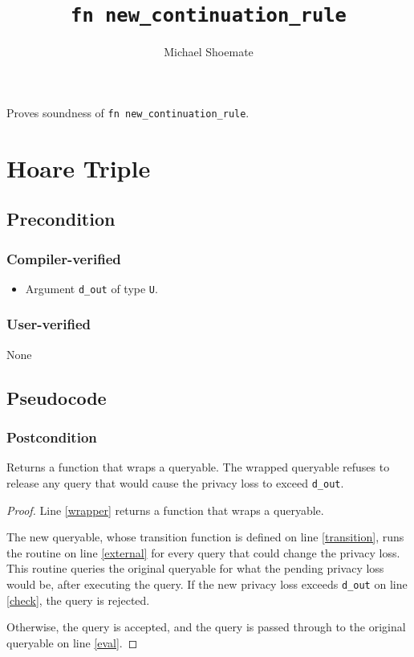 \documentclass{article}
\title{\texttt{fn new\_continuation\_rule}}
\author{Michael Shoemate}
\date{}
\begin{document}
\maketitle

\contrib
Proves soundness of \texttt{fn new\_continuation\_rule}.

\section{Hoare Triple}
\subsection*{Precondition}
\subsubsection*{Compiler-verified}
\begin{itemize}
    \item Argument \texttt{d\_out} of type \texttt{U}.
\end{itemize}
\subsubsection*{User-verified}
None

\subsection*{Pseudocode}


\subsubsection*{Postcondition}
\begin{theorem}
    Returns a function that wraps a queryable.
    The wrapped queryable refuses to release any query
    that would cause the privacy loss to exceed \texttt{d\_out}.
\end{theorem}

\begin{proof}
    Line \ref{wrapper} returns a function that wraps a queryable.
    
    The new queryable, whose transition function is defined on line \ref{transition},
    runs the routine on line \ref{external} for every query that could change the privacy loss.
    This routine queries the original queryable for what the pending privacy loss would be,
    after executing the query.
    If the new privacy loss exceeds \texttt{d\_out} on line \ref{check},
    the query is rejected.

    Otherwise, the query is accepted, and the query is passed through to the original queryable on line \ref{eval}.
\end{proof}
\end{document}
